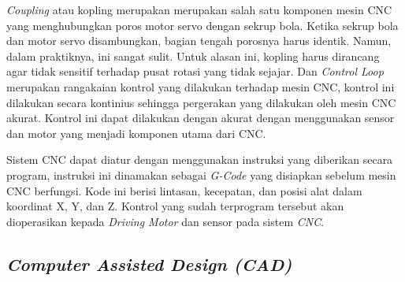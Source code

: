 \textit{Coupling} atau kopling merupakan merupakan salah satu komponen mesin CNC yang menghubungkan poros motor servo dengan sekrup bola. Ketika sekrup bola dan motor servo disambungkan, bagian tengah porosnya harus identik. Namun, dalam praktiknya, ini sangat sulit. Untuk alasan ini, kopling harus dirancang agar tidak sensitif terhadap pusat rotasi yang tidak sejajar. Dan \textit{Control Loop} merupakan rangakaian kontrol yang dilakukan terhadap mesin CNC, kontrol ini dilakukan secara kontinius sehingga pergerakan yang dilakukan oleh mesin CNC akurat. Kontrol ini dapat dilakukan dengan akurat dengan menggunakan sensor dan motor yang menjadi komponen utama dari CNC.

Sistem CNC dapat diatur dengan menggunakan instruksi yang diberikan secara program, instruksi ini dinamakan sebagai \textit{G-Code} yang disiapkan sebelum mesin CNC berfungsi. Kode ini berisi lintasan, kecepatan, dan posisi alat dalam koordinat X, Y, dan Z. Kontrol yang sudah terprogram tersebut akan dioperasikan kepada \textit{Driving Motor} dan sensor pada sistem \textit{CNC}. \parencite{cnc}

\subsection{\textit{Computer Assisted Design (CAD)}}

